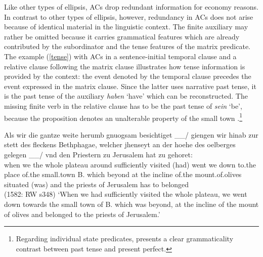 \documentclass[output=paper,colorlinks,citecolor=brown]{langscibook}
\begin{document}
\largerpage
\noindent
Like other types of ellipsis, ACs drop redundant information for economy reasons. In contrast to other types of ellipsis, however, redundancy in ACs does not arise because of identical material in the linguistic context. The finite auxiliary may rather be omitted because it carries grammatical features which are already contributed by the subordinator and the tense features of the matrix predicate. The example (\ref{tense}) with ACs in a sentence-initial temporal clause and a relative clause following the matrix clause illustrates how tense information is provided by the context: the event denoted by the temporal clause precedes the event expressed in the matrix clause. Since the latter uses narrative past tense, it is the past tense of the auxiliary \textit{haben} `have' which can be reconstructed. The missing finite verb in the relative clause has to be the past tense of \textit{sein} `be', because the proposition denotes an unalterable property of the small town \citep[27]{rothstein2008}.\footnote{Regarding individual state predicates, \textcite[27]{rothstein2008} presents a clear grammaticality contrast between past tense and present perfect.}  

\ea \label{tense}
\gll Als wir die gantze weite herumb gnuogsam besichtiget \_\_/ giengen wir hinab zur stett des fleckens Bethphagae, welcher jhenseyt an der hoehe des oelberges gelegen \_\_/ vnd den Priestern zu Jerusalem hat zu gehoret:  \\ when we the whole plateau around sufficiently visited (had) went we down to.the place of.the small.town B. which beyond at the incline of.the mount.of.olives situated (was) and the priests of Jerusalem has to belonged    \\ \hfill(1582: RW s348)
\glt `When we had sufficiently visited the whole plateau, we went down towards the small town of B. which was beyond, at the  incline of the mount of olives and belonged to the priests of Jerusalem.'
\z
\end{document}
